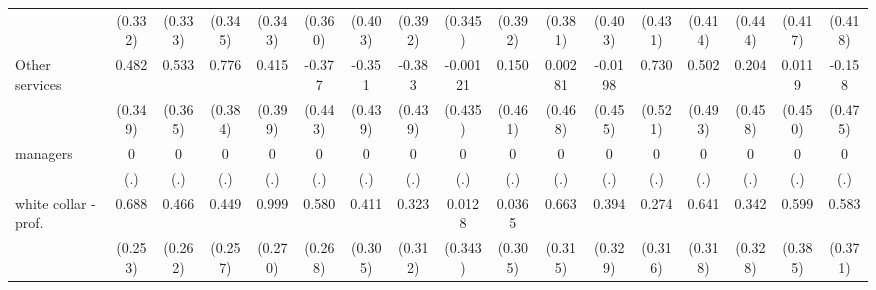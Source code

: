 {\begin{tabular}{l*{16}{c}}
                    &     (0.332)         &     (0.333)         &     (0.345)         &     (0.343)         &     (0.360)         &     (0.403)         &     (0.392)         &     (0.345)         &     (0.392)         &     (0.381)         &     (0.403)         &     (0.431)         &     (0.414)         &     (0.444)         &     (0.417)         &     (0.418)         \\
[1em]
Other services      &       0.482         &       0.533         &       0.776\sym{*}  &       0.415         &      -0.377         &      -0.351         &      -0.383         &    -0.00121         &       0.150         &     0.00281         &     -0.0198         &       0.730         &       0.502         &       0.204         &      0.0119         &      -0.158         \\
                    &     (0.349)         &     (0.365)         &     (0.384)         &     (0.399)         &     (0.443)         &     (0.439)         &     (0.439)         &     (0.435)         &     (0.461)         &     (0.468)         &     (0.455)         &     (0.521)         &     (0.493)         &     (0.458)         &     (0.450)         &     (0.475)         \\
[1em]
managers            &           0         &           0         &           0         &           0         &           0         &           0         &           0         &           0         &           0         &           0         &           0         &           0         &           0         &           0         &           0         &           0         \\
                    &         (.)         &         (.)         &         (.)         &         (.)         &         (.)         &         (.)         &         (.)         &         (.)         &         (.)         &         (.)         &         (.)         &         (.)         &         (.)         &         (.)         &         (.)         &         (.)         \\
[1em]
white collar - prof.&       0.688\sym{**} &       0.466         &       0.449         &       0.999\sym{***}&       0.580\sym{*}  &       0.411         &       0.323         &      0.0128         &      0.0365         &       0.663\sym{*}  &       0.394         &       0.274         &       0.641\sym{*}  &       0.342         &       0.599         &       0.583         \\
                    &     (0.253)         &     (0.262)         &     (0.257)         &     (0.270)         &     (0.268)         &     (0.305)         &     (0.312)         &     (0.343)         &     (0.305)         &     (0.315)         &     (0.329)         &     (0.316)         &     (0.318)         &     (0.328)         &     (0.385)         &     (0.371)         \\

\end{tabular}}
